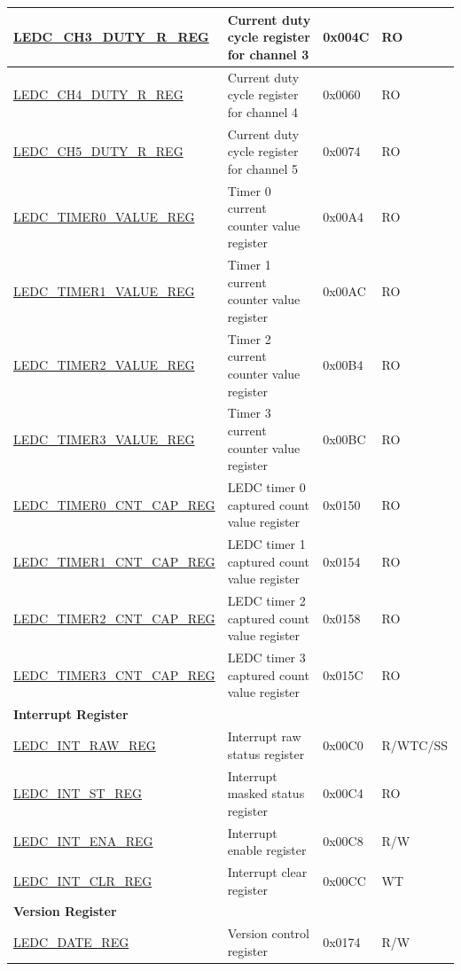 \begin{longtable}{ | p{5.5cm} | p{6.8cm} | p{1.3cm} | p{2cm}| }
    \hyperref[regdesc:LEDCCHNDUTYRREG]{LEDC\_CH3\_DUTY\_R\_REG} & Current duty cycle register for channel 3 & 0x004C & RO \\ \hline
    \hyperref[regdesc:LEDCCHNDUTYRREG]{LEDC\_CH4\_DUTY\_R\_REG} & Current duty cycle register for channel 4 & 0x0060 & RO \\ \hline
    \hyperref[regdesc:LEDCCHNDUTYRREG]{LEDC\_CH5\_DUTY\_R\_REG} & Current duty cycle register for channel 5 & 0x0074 & RO \\ \hline
    \hyperref[regdesc:LEDCTIMERNVALUEREG]{LEDC\_TIMER0\_VALUE\_REG} & Timer 0 current counter value register & 0x00A4 & RO \\ \hline
    \hyperref[regdesc:LEDCTIMERNVALUEREG]{LEDC\_TIMER1\_VALUE\_REG} & Timer 1 current counter value register & 0x00AC & RO \\ \hline
    \hyperref[regdesc:LEDCTIMERNVALUEREG]{LEDC\_TIMER2\_VALUE\_REG} & Timer 2 current counter value register & 0x00B4 & RO \\ \hline
    \hyperref[regdesc:LEDCTIMERNVALUEREG]{LEDC\_TIMER3\_VALUE\_REG} & Timer 3 current counter value register & 0x00BC & RO \\ \hline
    \hyperref[regdesc:LEDCTIMERNCNTCAPREG]{LEDC\_TIMER0\_CNT\_CAP\_REG} & LEDC timer 0 captured count value register & 0x0150 & RO \\ \hline
    \hyperref[regdesc:LEDCTIMERNCNTCAPREG]{LEDC\_TIMER1\_CNT\_CAP\_REG} & LEDC timer 1 captured count value register & 0x0154 & RO \\ \hline
    \hyperref[regdesc:LEDCTIMERNCNTCAPREG]{LEDC\_TIMER2\_CNT\_CAP\_REG} & LEDC timer 2 captured count value register & 0x0158 & RO \\ \hline
    \hyperref[regdesc:LEDCTIMERNCNTCAPREG]{LEDC\_TIMER3\_CNT\_CAP\_REG} & LEDC timer 3 captured count value register & 0x015C & RO \\ \hline
    \multicolumn{4}{|l|}{\textbf{Interrupt Register}} \\ \hline
    \hyperref[regdesc:LEDCINTRAWREG]{LEDC\_INT\_RAW\_REG} & Interrupt raw status register & 0x00C0 & R/WTC/SS \\ \hline
    \hyperref[regdesc:LEDCINTSTREG]{LEDC\_INT\_ST\_REG} & Interrupt masked status register & 0x00C4 & RO \\ \hline
    \hyperref[regdesc:LEDCINTENAREG]{LEDC\_INT\_ENA\_REG} & Interrupt enable register & 0x00C8 & R/W \\ \hline
    \hyperref[regdesc:LEDCINTCLRREG]{LEDC\_INT\_CLR\_REG} & Interrupt clear register & 0x00CC & WT \\ \hline
    \multicolumn{4}{|l|}{\textbf{Version Register}} \\ \hline
    \hyperref[regdesc:LEDCDATEREG]{LEDC\_DATE\_REG} & Version control register & 0x0174 & R/W \\ \hline
    \end{longtable}
